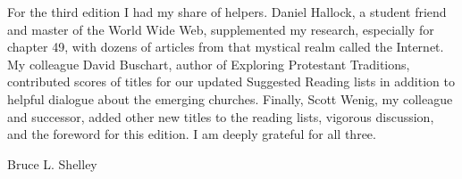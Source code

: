 For the third edition I had my share of helpers. Daniel Hallock, a student friend and master of the
World Wide Web, supplemented my research, especially for chapter 49, with dozens of articles from
that mystical realm called the Internet. My colleague David Buschart, author of Exploring Protestant
Traditions, contributed scores of titles for our updated Suggested Reading lists in addition to
helpful dialogue about the emerging churches. Finally, Scott Wenig, my colleague and successor,
added other new titles to the reading lists, vigorous discussion, and the foreword for this edition.
I am deeply grateful for all three.

\begin{signature}
Bruce L. Shelley
\end{signature}
